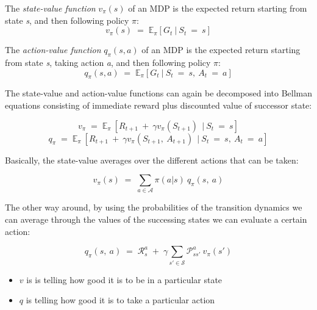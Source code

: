 \documentclass[10pt]{article}
\begin{document}
The \textit{state-value function} $v_{\pi}(s)$ of an MDP is the expected return starting from state \textit{s}, and then following policy $\pi$:
\begin{equation}
v_{\pi}(s) \; = \; \mathbb{E}_{\pi} [ G_{t} \: | \: S_{t} \: = \: s] 
\end{equation}

The \textit{action-value function} $q_{\pi}(s, a)$ of an MDP is the expected return starting from state \textit{s}, taking action \textit{a}, and then following policy $\pi$:
\begin{equation}
q_{\pi}(s,a) \; = \; \mathbb{E}_{\pi} [ G_{t} \: | \: S_{t} \: = \: s, \: A_{t} \: = \: a] 
\end{equation}

The state-value and action-value functions can again be decomposed into Bellman equations consisting of immediate reward plus discounted value of successor state:

\begin{equation}
v_{\pi} \; = \; \mathbb{E}_{\pi} \:[ R_{t+1} \: + \: \gamma v_{\pi} (S_{t+1}) \: \ | \: S_{t} \: = \: s]
\end{equation}
\begin{equation}
q_{\pi} \; = \; \mathbb{E}_{\pi} \:[ R_{t+1} \: + \: \gamma v_{\pi} (S_{t+1}, \: A_{t+1}) \: \ | \: S_{t} \: = \: s, \: A_{t} \: = \: a]
\end{equation}

Basically, the state-value averages over the different actions that can be taken:

\begin{equation}
v_{\pi}(s) \; = \; \sum_{a \in \mathcal{A}} \pi(a|s)\:q_{\pi}(s,\:a)
\end{equation}

The other way around, by using the probabilities of the transition dynamics we can average through the values of the successing states we can evaluate a certain action:

\begin{equation}
q_{\pi}(s,\:a)\;=\;\mathcal{R}_{s}^{a}\;+\;\gamma \sum_{s' \in \mathcal{S}} \mathcal{P}_{ss'}^{a}\:v_{\pi}(s')
\label{eq:qn_avg}
\end{equation}

\begin{itemize}
\item $v$ is is telling how good it is to be in a particular state
\item $q$ is telling how good it is to take a particular action
\end{itemize}
\end{document}
